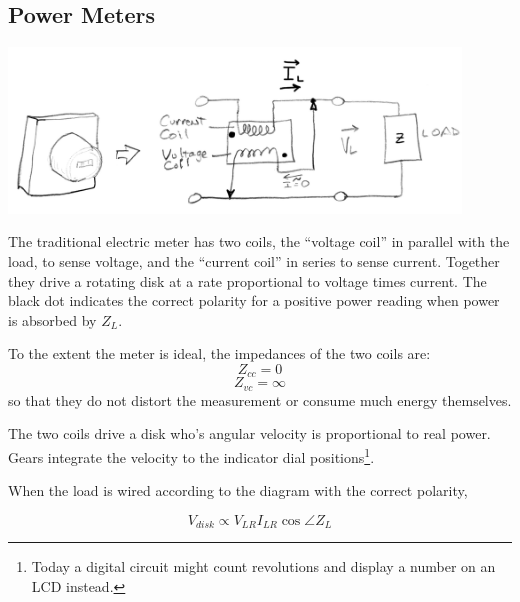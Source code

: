 \subsection{Power Meters}

\begin{center}
\includegraphics[width=120mm]{figsChapt03/TS44996.png}
\end{center}


The traditional electric meter has two coils, the ``voltage coil'' in parallel
with the load, to sense voltage, and the ``current coil''
in series to sense current.   Together they drive a rotating disk at a rate proportional
to voltage times current.
The black dot indicates the correct polarity for a
positive power reading when power is absorbed by $Z_L$.


To the extent the meter is ideal, the impedances of the two coils are:
\[
Z_{cc} = 0
\]
\[
Z_{vc} = \infty
\]
so that they do not distort the measurement or consume much energy themselves.



The two coils drive a disk who's angular velocity is
proportional to real power.   Gears integrate the  velocity to the indicator dial
positions\footnote{Today a digital circuit might count revolutions and display
a number on an LCD instead.}.

When the load is wired according to the diagram with the correct polarity,

\[
V_{disk} \propto V_{LR} I_{LR} \cos \angle Z_L
\]



